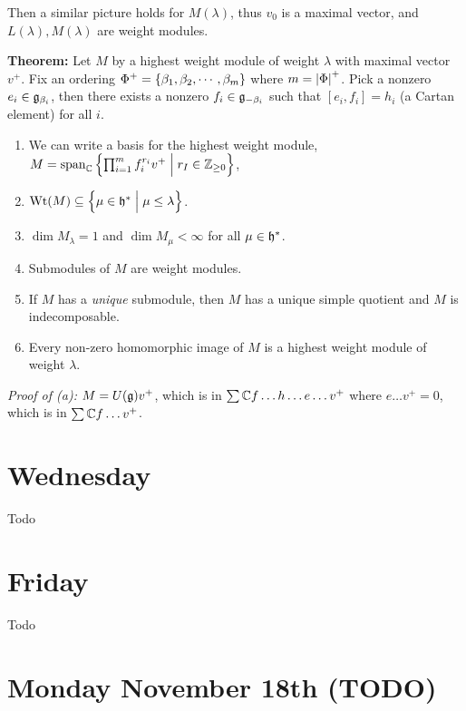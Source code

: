 Then a similar picture holds for \(M(\lambda)\), thus \(v_0\) is a
maximal vector, and \(L(\lambda), M(\lambda)\) are weight modules.

\textbf{Theorem:} Let \(M\) by a highest weight module of weight
\(\lambda\) with maximal vector \(v^+\). Fix an ordering
\(\Phi^+ = \left\{{\beta_1, \beta_2, \cdots, \beta_m}\right\}\) where
\(m = {\left\lvert {\Phi} \right\rvert}^+\). Pick a nonzero \(e_i \in {\mathfrak{g}}_{\beta_i}\), then
there exists a nonzero \(f_i \in {\mathfrak{g}}_{-\beta_i}\) such that
\([e_i, f_i] = h_i\) (a Cartan element) for all \(i\).

\begin{enumerate}
\def\labelenumi{\alph{enumi}.}
\tightlist
\item
  We can write a basis for the highest weight module,
  \(M = \mathrm{span}_{\mathbb{C}}\left\{{ \prod_{i=1}^m f_i^{r_i} v^+ \mathrel{\Big|} r_I \in {\mathbb{Z}}_{\geq 0} }\right\}\),
\item
  \(\mathrm{Wt}(M) \subseteq \left\{{\mu \in {\mathfrak{h}}^* \mathrel{\Big|} \mu \leq \lambda}\right\}\).
\item
  \(\dim M_\lambda = 1\) and \(\dim M_\mu < \infty\) for all
  \(\mu \in {\mathfrak{h}}^*\).
\item
  Submodules of \(M\) are weight modules.
\item
  If \(M\) has a \emph{unique} submodule, then \(M\) has a unique simple
  quotient and \(M\) is indecomposable.
\item
  Every non-zero homomorphic image of \(M\) is a highest weight module
  of weight \(\lambda\).
\end{enumerate}

\emph{Proof of (a):} \(M = U({\mathfrak{g}})v^+\), which is in
\(\sum {\mathbb{C}} f \ldots h \ldots e \ldots v^+\) where \(e\ldots v^+ = 0\),
which is in \(\sum {\mathbb{C}} f \ldots v^+\).

\hypertarget{wednesday}{%
\section{Wednesday}\label{wednesday}}

Todo

\hypertarget{friday}{%
\section{Friday}\label{friday}}

Todo

\hypertarget{monday-november-18th-todo}{%
\section{Monday November 18th (TODO)}\label{monday-november-18th-todo}}

